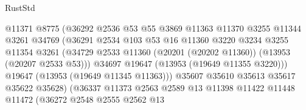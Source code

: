\begin{lexlean}{RustStd}
\begin{coremodule}
                                      @11371
                                      @8775
                                      (@36292
                                        @2536
                                        @53
                                        @55
                                        @3869
                                        @11363
                                        @11370
                                        @3255
                                        @11344
                                        @3261
                                        @34769
                                        (@36291
                                          @2534
                                          @103
                                          @53
                                          @16
                                          @11360
                                          @3220
                                          @3234
                                          @3255
                                          @11354
                                          @3261
                                          (@34729
                                            @2533
                                            @11360
                                            (@20201 (@20202 @11360))
                                            (@13953 (@20207 @2533 @53)))
                                          @34697
                                          @19647
                                          (@13953 (@19649 @11355 @3220)))
                                        @19647
                                        (@13953 (@19649 @11345 @11363)))
                                      @35607
                                      @35610
                                      @35613
                                      @35617
                                      @35622
                                      @35628)
                                    (@36337
                                      @11373
                                      @2563
                                      @2589
                                      @13
                                      @11398
                                      @11422
                                      @11448
                                      @11472
                                      (@36272
                                        @2548
                                        @2555
                                        @2562
                                        @13

\end{coremodule}
\end{lexlean}
